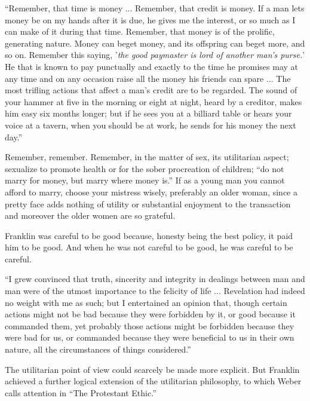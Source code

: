 \documentclass[twoside,nohyper,openany,nobib]{tufte-book}
\begin{document}
``Remember, that time is money ... Remember, that credit is money. If a
man lets money be on my hands after it is due, he gives me the interest,
or so much as I can make of it during that time. Remember, that money is
of the prolific, generating nature. Money can beget money, and its
offspring can beget more, and so on. Remember this saying, '\emph{the
good paymaster is lord of another man's purse.}' He that is known to pay
punctually and exactly to the time he promises may at any time and on
any occasion raise all the money his friends can spare ... The most
trifling actions that affect a man's credit are to be regarded. The
sound of your hammer at five in the morning or eight at night, heard by
a creditor, makes him easy six months longer; but if he sees you at a
billiard table or hears your voice at a tavern, when you should be at
work, he sends for his money the next day.''

Remember, remember. Remember, in the matter of sex, its utilitarian
aspect; sexualize to promote health or for the sober procreation of
children; ``do not marry for money, but marry where money is.'' If as a
young man you cannot afford to marry, choose your mistress wisely,
preferably an older woman, since a pretty face adds nothing of utility
or substantial enjoyment to the transaction and moreover the older women
are so grateful.

Franklin was careful to be good because, honesty being the best policy,
it paid him to be good. And when he was not careful to be good, he was
careful to be careful.

``I grew convinced that truth, sincerity and integrity in dealings
between man and man were of the utmost importance to the felicity of
life ... Revelation had indeed no weight with me as such; but I
entertained an opinion that, though certain actions might not be bad
because they were forbidden by it, or good because it commanded them,
yet probably those actions might be forbidden because they were bad for
us, or commanded because they were beneficial to us in their own nature,
all the circumstances of things considered.''

The utilitarian point of view could scarcely be made more explicit. But
Franklin achieved a further logical extension of the utilitarian
philosophy, to which Weber calls attention in ``The Protestant Ethic.''
\end{document}
